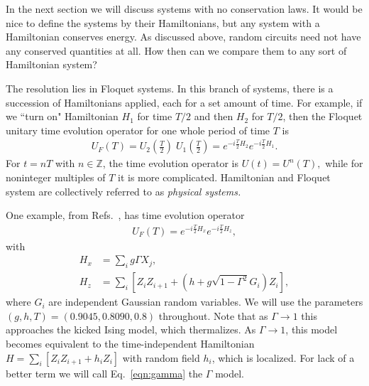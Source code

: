 \documentclass[a4paper,11pt]{article}
\newcommand{\nn}{\nonumber\\}
\begin{document}
In the next section we will discuss systems with no conservation laws. It would be nice to define the systems by their Hamiltonians, but any system with a Hamiltonian conserves energy. As discussed above, random circuits need not have any conserved quantities at all. How then can we compare them to any sort of Hamiltonian system?

The resolution lies in Floquet systems. In this branch of systems, there is a succession of Hamiltonians applied, each for a set amount of time. For example, if we ``turn on" Hamiltonian $H_1$ for time $T/2$ and then $H_2$ for $T/2$, then the Floquet unitary time evolution operator for one whole period of time $T$ is 
\begin{align}
U_F(T) = U_2\left(\frac{T}{2}\right)\; U_1\left(\frac{T}{2}\right) = e^{-i\frac{T}{2}H_2} e^{-i\frac{T}{2}H_1}.
\end{align}
For $t=nT$ with $n\in \mathbb{Z}$, the time evolution operator is $U(t)=U^n(T),$ while for noninteger multiples of $T$ it is more complicated. Hamiltonian and Floquet system are collectively referred to as \emph{physical systems.}
%

One example, from Refs.~\cite{ZhangFloq, ChenOtoc}, has time evolution operator 
\begin{align}
U_F(T) = e^{-i\frac{T}{2}H_x}e^{-i\frac{T}{2}H_z}, \label{eqn:gamma}
\end{align}
with
\begin{align}
H_x &= \sum_i g\Gamma X_j,\nn
H_z &= \sum_i \left[Z_iZ_{i+1} + (h+g\sqrt{1-\Gamma^2}G_i)Z_i\right],
\end{align}
where $G_i$ are independent Gaussian random variables. We will use the parameters $(g,h,T) = (0.9045,0.8090,0.8)$ throughout.
Note that as $\Gamma\to1$ this approaches the kicked Ising model, which thermalizes. As $\Gamma\to1$, this model becomes equivalent to the time-independent Hamiltonian $H=\sum_i\left[Z_iZ_{i+1} + h_iZ_i\right]$ with random field $h_i$, which is localized. For lack of a better term we will call Eq.~\ref{eqn:gamma} the $\Gamma$ model.
\end{document}
